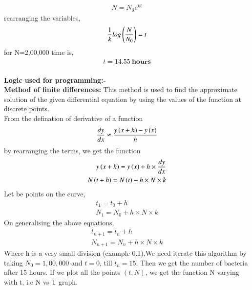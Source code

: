 \documentclass[journal]{IEEEtran}
\begin{document}
\begin{align}
N = N_0e^{kt} \label{10}
\end{align}
rearranging the variables,
\begin{align}
\frac{1}{k}log \left(\frac{N}{N_0}\right) = t\label{10}
\end{align}
for N=2,00,000 time is,
\begin{align}
    t = 14.55 \ \textbf{hours}
\end{align}\\
\textbf{Logic used for programming:-} \\
\textbf{Method of finite differences:} This method is used to find the approximate solution of the given differential equation by using the values of the function at discrete points.  \\
From the defination of derivative of a function 
\begin{align}
\frac{dy}{dx} \approx \frac{y\left(x+h\right)-y\left(x\right)}{h} \label{11}
\end{align}
by rearranging the terms, we get the function
\begin{align}
y\left(x+h\right)=y\left(x\right)+h \times \frac{dy}{dx} \\
N\left(t+h\right)=N\left(t\right)+h \times N \times k
\end{align}
Let  be points on the curve,
\begin{align}
t_1=t_0+h \\
N_1=N_0+h \times N \times k
\end{align}
On  generalising the above equations,
\begin{align}
t_{n+1}=t_{n}+h \\
N_{n+1}=N_{n}+h \times N \times k \label{21}
\end{align}
Where h is a very small division (example 0.1),We need iterate this algorithm by taking $N_0=1,00,000$ and $t=0$, till $t_n=15$. Then we get the number of bacteria  after 15 hours.
If we plot all the points $(t,N)$, we get the function N varying with t, i.e N vs T graph. \\
\end{document}
